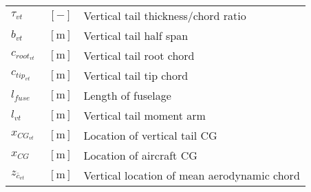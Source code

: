 {\begin{supertabular}{lcl}
$\tau_{vt}$ & $~[-]$ & Vertical tail thickness/chord ratio \\
$b_{vt}$ & $~\mathrm{[m]}$ & Vertical tail half span \\
$c_{root_{vt}}$ & $~\mathrm{[m]}$ & Vertical tail root chord \\
$c_{tip_{vt}}$ & $~\mathrm{[m]}$ & Vertical tail tip chord \\
$l_{fuse}$ & $~\mathrm{[m]}$ & Length of fuselage \\
$l_{vt}$ & $~\mathrm{[m]}$ & Vertical tail moment arm \\
$x_{CG_{vt}}$ & $~\mathrm{[m]}$ & Location of vertical tail CG \\
$x_{CG}$ & $~\mathrm{[m]}$ & Location of aircraft CG \\
$z_{\bar{c}_{vt}}$ & $~\mathrm{[m]}$ & Vertical location of mean aerodynamic chord \\
\bottomrule
\end{supertabular}}

% 
